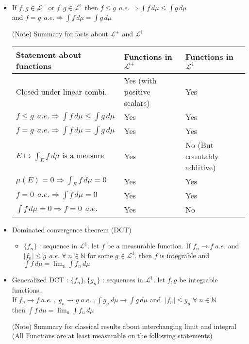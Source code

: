 \documentclass[12pt]{article}
\newcommand{\N}{\mathbb{N}}
\newcommand{\LL}{\mathcal{L}}
\newcommand{\forany}{\; \forall \;}
\begin{document}
\begin{itemize}
    \item If $f, g\in \LL^+$ or $f,g\in \LL^1$ then $f\leq g\;\, a.e. \Rightarrow \int f\, d\mu\leq \int g\, d\mu$  \\and $f=g \;\, a.e. \Rightarrow \int f\, d\mu=\int g\, d\mu$
    \item[(Note)] Summary for facts about $\LL^+$ and $\LL^1$
    \\ 
    \begin{tabular}{|p{5.3cm}||p{4.7cm}|p{5.1cm}|}
        \hline
        Statement about functions & Functions in $\LL^+$ & Functions in $\LL^1$ \\
        \hline
        Closed under linear combi.   & Yes (with positive scalars)  & Yes \\
        $f\leq g\;\, a.e.\Rightarrow \int f\, d\mu\leq \int g\, d\mu$ &  Yes  & Yes \\
        $f=g\;\, a.e.\Rightarrow \int f\, d\mu = \int g\, d\mu$ & Yes & Yes \\
        $E\mapsto \int_E f\, d\mu$ is a measure   & Yes & No (But countably additive)\\
        $ \mu(E)=0 \Rightarrow \int_E f \, d\mu=0$ &  Yes  &  Yes \\
        $f=0\;\, a.e.\Rightarrow \int f \, d\mu=0$ & Yes  & Yes   \\
        $\int f\, d\mu=0 \Rightarrow f=0 \;\, a.e.$ & Yes  & No \\
        \hline
     \end{tabular}
    \item Dominated convergence theorem (DCT)
    \begin{itemize}
        \item $\{f_n\}$ : sequence in $\LL^1$. let $f$ be a measurable function. If $f_n\rightarrow f \; a.e.$ and \\$|f_n|\leq g \;\, a.e.\forany n\in \N$ for some $g\in \LL^1$, then $f$ is integrable and $\int f \, d\mu= \lim_n \int f_n \, d\mu$ 
    \end{itemize}
    \item Generalized DCT : $\{f_n\}, \{g_n\}$ : sequences in $\LL^1$. let $f,g$ be integrable functions.\\If $f_n\rightarrow f \; a.e.\;,\; g_n\rightarrow g\; a.e.\;,\int g_n \, d\mu\rightarrow \int g\, d\mu$ and $\; |f_n|\leq g_n \forany n\in \N$ \\then $\int f \, d\mu= \lim_n \int f_n \, d\mu$ 
   
    \item[(Note)] Summary for classical results about interchanging limit and integral
    \\ (All Functions are at least measurable on the following statements) 
    \begin{itemize}
        

\end{itemize}
\end{itemize}
\end{document}
